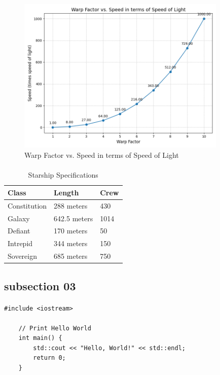 \documentclass[class=book, crop=false]{standalone}
\begin{document}
\begin{figure}[htbp]
    \centering
    \includegraphics[width=10cm]{src/contents/figures_and_plots/plots/warp_factor_vs_speed_of_light.png}
    \caption{Warp Factor vs. Speed in terms of Speed of Light}
    \label{fig:warp}
\end{figure}

\paragraph*{}
\blindtext

\begin{table}[htbp]
    \centering
    \caption{Starship Specifications}
    \label{tab:starship-specs}
    \begin{tabular}{@{}lll@{}} %
        \toprule
        \textbf{Class} & \textbf{Length} & \textbf{Crew} \\
        \midrule
        Constitution & 288 meters & 430 \\
        Galaxy & 642.5 meters & 1014 \\
        Defiant & 170 meters & 50 \\
        Intrepid & 344 meters & 150 \\
        Sovereign & 685 meters & 750 \\
        \bottomrule
    \end{tabular}
\end{table}

\subsection{subsection 03}

\paragraph*{}
\blindtext

\begin{lstlisting}[style=cpp, caption={Sample C++ Code}, label=lst:cppsample]
    #include <iostream>
    
    // Print Hello World
    int main() {
        std::cout << "Hello, World!" << std::endl;
        return 0;
    }
\end{lstlisting}
\end{document}
